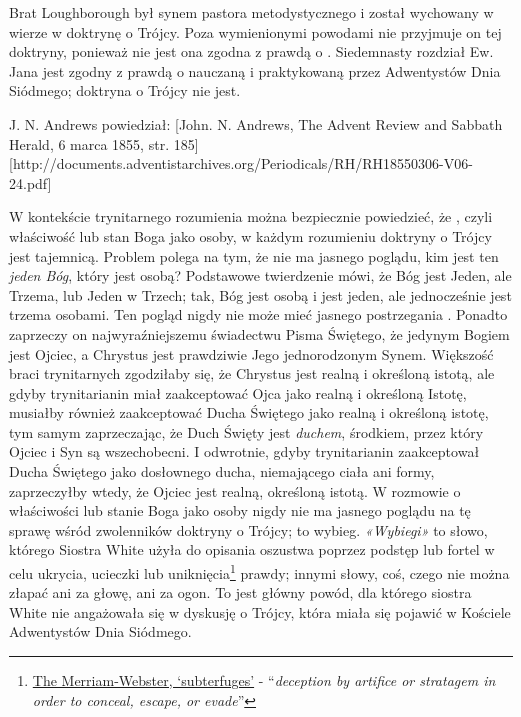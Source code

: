 Brat Loughborough był synem pastora metodystycznego i został wychowany w wierze w doktrynę o Trójcy. Poza wymienionymi powodami nie przyjmuje on tej doktryny, ponieważ nie jest ona zgodna z prawdą o . Siedemnasty rozdział Ew. Jana jest zgodny z prawdą o  nauczaną i praktykowaną przez Adwentystów Dnia Siódmego; doktryna o Trójcy nie jest.

J. N. Andrews powiedział: [John. N. Andrews, The Advent Review and Sabbath Herald, 6 marca 1855, str. 185][http://documents.adventistarchives.org/Periodicals/RH/RH18550306-V06-24.pdf]

W kontekście trynitarnego rozumienia  można bezpiecznie powiedzieć, że , czyli właściwość lub stan Boga jako osoby, w każdym rozumieniu doktryny o Trójcy jest tajemnicą. Problem polega na tym, że nie ma jasnego poglądu, kim jest ten \textit{jeden Bóg}, który jest osobą? Podstawowe twierdzenie mówi, że Bóg jest Jeden, ale Trzema, lub Jeden w Trzech; tak, Bóg jest osobą i jest jeden, ale jednocześnie jest trzema osobami. Ten pogląd nigdy nie może mieć jasnego postrzegania . Ponadto zaprzeczy on najwyraźniejszemu świadectwu Pisma Świętego, że jedynym Bogiem jest Ojciec, a Chrystus jest prawdziwie Jego jednorodzonym Synem. Większość braci trynitarnych zgodziłaby się, że Chrystus jest realną i określoną istotą, ale gdyby trynitarianin miał zaakceptować Ojca jako realną i określoną Istotę, musiałby również zaakceptować Ducha Świętego jako realną i określoną istotę, tym samym zaprzeczając, że Duch Święty jest \textit{duchem}, środkiem, przez który Ojciec i Syn są wszechobecni. I odwrotnie, gdyby trynitarianin zaakceptował Ducha Świętego jako dosłownego ducha, niemającego ciała ani formy, zaprzeczyłby wtedy, że Ojciec jest realną, określoną istotą. W rozmowie o właściwości lub stanie Boga jako osoby nigdy nie ma jasnego poglądu na tę sprawę wśród zwolenników doktryny o Trójcy; to wybieg. \textit{«Wybiegi»} to słowo, którego Siostra White użyła do opisania oszustwa poprzez podstęp lub fortel w celu ukrycia, ucieczki lub uniknięcia\footnote{\href{https://www.merriam-webster.com/dictionary/subterfuges}{The Merriam-Webster, ‘subterfuges’} - “\textit{deception by artifice or stratagem in order to conceal, escape, or evade}”} prawdy; innymi słowy, coś, czego nie można złapać ani za głowę, ani za ogon. To jest główny powód, dla którego siostra White nie angażowała się w dyskusję o Trójcy, która miała się pojawić w Kościele Adwentystów Dnia Siódmego.

